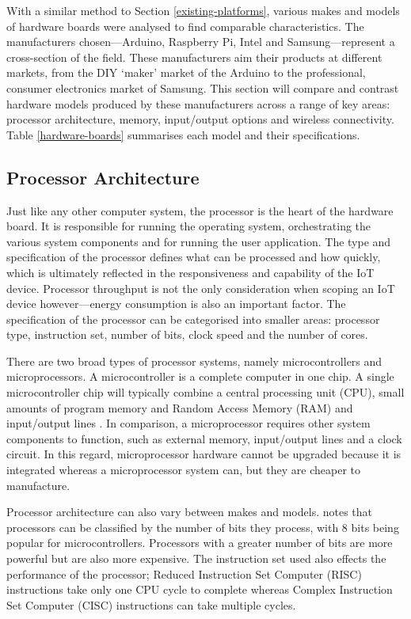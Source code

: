     With a similar method to Section \ref{existing-platforms}, various makes and models of hardware boards were analysed to find comparable characteristics. The manufacturers chosen---Arduino, Raspberry Pi, Intel and Samsung---represent a cross-section of the field. These manufacturers aim their products at different markets, from the DIY `maker' market of the Arduino to the professional, consumer electronics market of Samsung. This section will compare and contrast hardware models produced by these manufacturers across a range of key areas: processor architecture, memory, input/output options and wireless connectivity. Table \ref{hardware-boards} summarises each model and their specifications.

    \subsection{Processor Architecture}
      Just like any other computer system, the processor is the heart of the hardware board. It is responsible for running the operating system, orchestrating the various system components and for running the user application. The type and specification of the processor defines what can be processed and how quickly, which is ultimately reflected in the responsiveness and capability of the IoT device. Processor throughput is not the only consideration when scoping an IoT device however---energy consumption is also an important factor. The specification of the processor can be categorised into smaller areas: processor type, instruction set, number of bits, clock speed and the number of cores.

      There are two broad types of processor systems, namely microcontrollers and microprocessors. A microcontroller is a complete computer in one chip. A single microcontroller chip will typically combine a central processing unit (CPU), small amounts of program memory and Random Access Memory (RAM) and input/output lines \citep{microcontrollers:2011}. In comparison, a microprocessor requires other system components to function, such as external memory, input/output lines and a clock circuit. In this regard, microprocessor hardware cannot be upgraded because it is integrated whereas a microprocessor system can, but they are cheaper to manufacture.

      Processor architecture can also vary between makes and models. \citep{microcontrollers:2011} notes that processors can be classified by the number of bits they process, with 8 bits being popular for microcontrollers. Processors with a greater number of bits are more powerful but are also more expensive. The instruction set used also effects the performance of the processor; Reduced Instruction Set Computer (RISC) instructions take only one CPU cycle to complete whereas Complex Instruction Set Computer (CISC) instructions can take multiple cycles.

